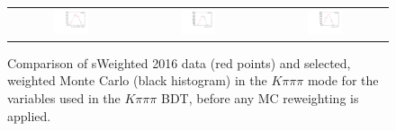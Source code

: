 \begin{figure}
\begin{tabular}{ccc}
\includegraphics[width=0.3\textwidth]{ANA_resources/Plots/Monte_carlo/data_vs_MC//Kpipipi/log10(KstarPi_IPCHI2_OWNPV)_2016.pdf} & \includegraphics[width=0.3\textwidth]{ANA_resources/Plots/Monte_carlo/data_vs_MC//Kpipipi/log10(KstarK_PT)_2016.pdf} & \includegraphics[width=0.3\textwidth]{ANA_resources/Plots/Monte_carlo/data_vs_MC//Kpipipi/log10(KstarPi_PT)_2016.pdf} \\
\end{tabular}
\caption{Comparison of sWeighted 2016 data (red points) and selected, weighted Monte Carlo (black histogram) in the $K\pi\pi\pi$ mode for the variables used in the $K\pi\pi\pi$ BDT, before any MC reweighting is applied.}
\label{fig:data_vs_MC_Kpipipi_2016_unweighted}
\end{figure}

